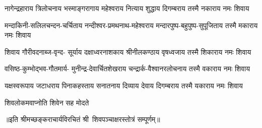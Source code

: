 

\fourlineindentedshloka
{नागेन्द्रहाराय त्रिलोचनाय}
{भस्माङ्गरागाय महेश्वराय}
{नित्याय शुद्धाय दिगम्बराय}
{तस्मै नकाराय नमः शिवाय}%

\fourlineindentedshloka
{मन्दाकिनी-सलिलचन्दन-चर्चिताय}
{नन्दीश्वर-प्रमथनाथ-महेश्वराय}
{मन्दारपुष्प-बहुपुष्प-सुपूजिताय}
{तस्मै मकाराय नमः शिवाय}%

\fourlineindentedshloka
{शिवाय गौरीवदनाब्ज-वृन्द-}
{सूर्याय दक्षाध्वरनाशकाय}
{श्रीनीलकण्ठाय वृषध्वजाय}
{तस्मै शिकाराय नमः शिवाय}%

\fourlineindentedshloka
{वसिष्ठ-कुम्भोद्भव-गौतमार्य-}
{मुनीन्द्र-देवार्चितशेखराय}
{चन्द्रार्क-वैश्वानरलोचनाय}
{तस्मै वकाराय नमः शिवाय}%

\fourlineindentedshloka
{यक्षस्वरूपाय जटाधराय}
{पिनाकहस्ताय सनातनाय}
{दिव्याय देवाय दिगम्बराय}
{तस्मै यकाराय नमः शिवाय}%

{शिवलोकमवाप्नोति शिवेन सह मोदते}

॥इति श्रीमच्छङ्कराचार्यविरचितं श्री~शिवपञ्चाक्षरस्तोत्रं सम्पूर्णम्॥
